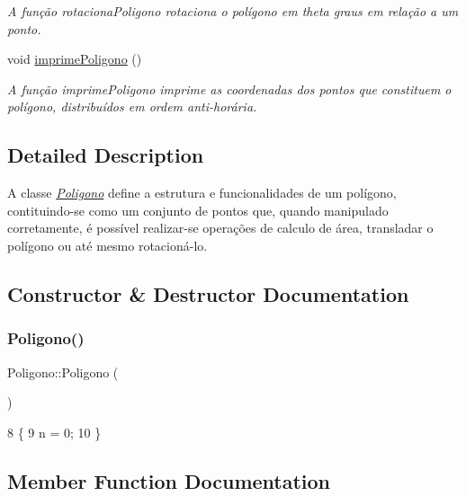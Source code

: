 \begin{DoxyCompactItemize}
\begin{DoxyCompactList}\small\item\em A função {\itshape rotaciona\+Poligono} rotaciona o polígono em theta graus em relação a um ponto. \end{DoxyCompactList}\item 
void \hyperlink{class_poligono_a87d58f9d4827793eaa811491cce097b0}{imprime\+Poligono} ()
\begin{DoxyCompactList}\small\item\em A função {\itshape imprime\+Poligono} imprime as coordenadas dos pontos que constituem o polígono, distribuídos em ordem anti-\/horária. \end{DoxyCompactList}\end{DoxyCompactItemize}


\subsection{Detailed Description}
A classe {\itshape \hyperlink{class_poligono}{Poligono}} define a estrutura e funcionalidades de um polígono, contituindo-\/se como um conjunto de pontos que, quando manipulado corretamente, é possível realizar-\/se operações de calculo de área, transladar o polígono ou até mesmo rotacioná-\/lo. 

\subsection{Constructor \& Destructor Documentation}
\mbox{\label{class_poligono_a9311a9a1496878c09c8508b3636e2870}} 
\subsubsection{\texorpdfstring{Poligono()}{Poligono()}}
{\footnotesize\ttfamily Poligono\+::\+Poligono (\begin{DoxyParamCaption}{ }\end{DoxyParamCaption})}


\begin{DoxyCode}
8 \{
9     n = 0;
10 \}
\end{DoxyCode}


\subsection{Member Function Documentation}
\mbox{\label{class_poligono_a051cc49fca5417dbc8c6ba7a1edc2723}} 
